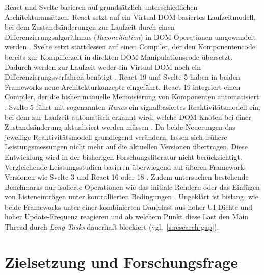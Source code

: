 React und Svelte basieren auf grundsätzlich unterschiedlichen Architekturansätzen. React setzt auf ein Virtual-DOM-basiertes Laufzeitmodell, bei dem Zustandsänderungen zur Laufzeit durch einen Differenzierungsalgorithmus (\textit{Reconciliation}) in DOM-Operationen umgewandelt werden \cite{kumar-fluentreact-2024}. Svelte setzt stattdessen auf einen Compiler, der den Komponentencode bereits zur Kompilierzeit in direkten DOM-Manipulationscode übersetzt. Dadurch werden zur Laufzeit weder ein Virtual DOM noch ein Differenzierungsverfahren benötigt \cite{svelte_vdom-2018}. React 19 und Svelte 5 haben in beiden Frameworks neue Architekturkonzepte eingeführt. React 19 integriert einen Compiler, der die bisher manuelle Memoisierung von Komponenten automatisiert \cite{react_compiler_2025}. Svelte 5 führt mit sogenannten \textit{Runes} ein signalbasiertes Reaktivitätsmodell ein, bei dem zur Laufzeit automatisch erkannt wird, welche DOM-Knoten bei einer Zustandsänderung aktualisiert werden müssen \cite{svelte_runes_2023}. Da beide Neuerungen das jeweilige Reaktivitätsmodell grundlegend verändern, lassen sich frühere Leistungsmessungen nicht mehr auf die aktuellen Versionen übertragen. Diese Entwicklung wird in der bisherigen Forschungsliteratur nicht berücksichtigt. Vergleichende Leistungsstudien basieren überwiegend auf älteren Framework-Versionen wie Svelte 3 und React 16 oder 18 \cite{levlin-dom-benchmark-2020, putra-performance-2025, ollila-rendering_performance-2022}. Zudem untersuchen bestehende Benchmarks nur isolierte Operationen wie das initiale Rendern oder das Einfügen von Listeneinträgen unter kontrollierten Bedingungen \cite{krause-benchmark-2026}. Ungeklärt ist bislang, wie beide Frameworks unter einer kombinierten Dauerlast aus hoher UI-Dichte und hoher Update-Frequenz reagieren und ab welchem Punkt diese Last den Main Thread durch \textit{Long Tasks} dauerhaft blockiert (vgl.\ \cref{s:research-gap}).

\section{Zielsetzung und Forschungsfrage}
\label{s:zielsetzung}

